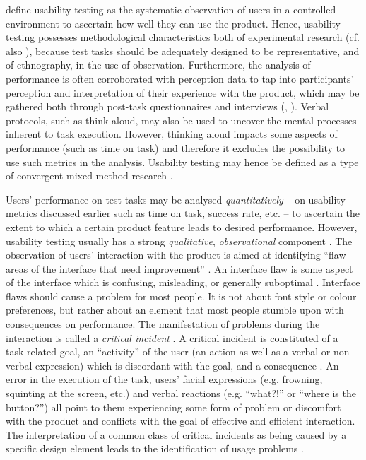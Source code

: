 \citet{seewald2004kritischen} define usability testing as the systematic observation of users in a controlled environment to ascertain how well they can use the product. Hence, usability testing possesses methodological characteristics both of experimental research (cf. also \cite[23]{rubin2008handbook}), because test tasks should be adequately designed to be representative, and of ethnography, in the use of observation. Furthermore, the analysis of performance is often corroborated with perception data to tap into participants’ perception and interpretation of their experience with the product, which may be gathered both through post-task questionnaires and interviews (\cite[267]{lazar2017research}, \cite[65]{rubin2008handbook}). Verbal protocols, such as think-aloud, may also be used to uncover the mental processes inherent to task execution. However, thinking aloud impacts some aspects of performance (such as time on task) and therefore it excludes the possibility to use such metrics in the analysis. Usability testing may hence be defined as a type of convergent mixed-method research \citep{creswell2017research}.

Users’ performance on test tasks may be analysed \textit{quantitatively} -- on usability metrics discussed earlier such as time on task, success rate, etc. -- to ascertain the extent to which a certain product feature leads to desired performance. However, usability testing usually has a strong \textit{qualitative}, \textit{observational} component \citep{seewald2004kritischen}. The observation of users’ interaction with the product is aimed at identifying ``flaw areas of the interface that need improvement'' \citep[264]{lazar2017research}. An interface flaw is some aspect of the interface which is confusing, misleading, or generally suboptimal \citep[264]{lazar2017research}. Interface flaws should cause a problem for most people. It is not about font style or colour preferences, but rather about an element that most people stumble upon with consequences on performance. The manifestation of problems during the interaction is called a \textit{critical incident} \citep{seewald2004kritischen}. A critical incident is constituted of a task-related goal, an ``activity'' of the user (an action as well as a verbal or non-verbal expression) which is discordant with the goal, and a consequence \citep{seewald2004kritischen}. An error in the execution of the task, users’ facial expressions (e.g. frowning, squinting at the screen, etc.) and verbal reactions (e.g. ``what?!'' or ``where is the button?'') all point to them experiencing some form of problem or discomfort with the product and conflicts with the goal of effective and efficient interaction. The interpretation of a common class of critical incidents as being caused by a specific design element leads to the identification of usage problems \citep{seewald2004kritischen}.

